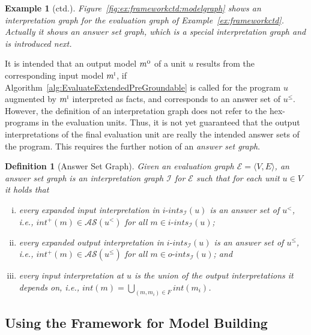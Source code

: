 \documentclass[11pt,fleqn,twoside]{article}
\newcommand\hex{{\sc hex}\xspace}
\newtheorem{definition}{Definition}
\newtheorem{example}{Example}
\begin{document}
{			\begin{example}[ctd.]
				\label{ex:frameworkctdmodelgraph}
				Figure~\ref{fig:ex:frameworkctd:modelgraph} shows an interpretation graph for the evaluation graph of Example~\ref{ex:frameworkctd}.
				Actually it shows an answer set graph, which is a special interpretation graph and is introduced next.
			\end{example}

			It is intended that an output model $m^{\textsc{o}}$ of a unit $u$ results from the corresponding input model $m^{\textsc{i}}$,
			if Algorithm~\ref{alg:EvaluateExtendedPreGroundable} is called for the program $u$
			augmented by $m^{\textsc{i}}$ interpreted as facts, and corresponds to an answer set of $u^{\le}$.
			However, the definition of an interpretation graph does not refer to the \hex{}-programs
			in the evaluation units. Thus, it is not yet guaranteed that the output interpretations
			of the final evaluation unit are really the intended answer sets of the program.
			This requires the further notion of an \emph{answer set graph}.
			
			\begin{definition}[Answer Set Graph]
				\label{def:answersetgraph}
				Given an evaluation graph $\mathcal{E} = \langle V, E \rangle$,
				an \emph{answer set graph} is an interpretation graph $\mathcal{I}$ for $\mathcal{E}$ such
				that for each unit $u \in V$ it holds that
				\begin{enumerate}[(i)]
					\item every expanded input interpretation in $\mathit{i\mbox{-}ints}_{\mathcal{I}}(u)$
						is an answer set of $u^{<}$, i.e., $\mathit{int}^{+}(m) \in \mathcal{AS}(u^{<})$ for all $m \in \mathit{i\mbox{-}ints}_{\mathcal{I}}(u)$;
					\item every expanded output interpretation in $\mathit{i\mbox{-}ints}_{\mathcal{I}}(u)$
						is an answer set of $u^{\le}$, i.e., $\mathit{int}^{+}(m) \in \mathcal{AS}(u^{\le})$ for all $m \in \mathit{o\mbox{-}ints}_{\mathcal{I}}(u)$; and
					\item every input interpretation at $u$ is the union of the output interpretations it depends on, i.e.,
						$\mathit{int}(m) = \bigcup_{(m,m_i) \in F} \mathit{int}(m_i)$.
				\end{enumerate}
			\end{definition}
		
		\subsection{Using the Framework for Model Building}
		\label{sec:domainexpansion:framework:answersetgraph}
	
}
\end{document}
